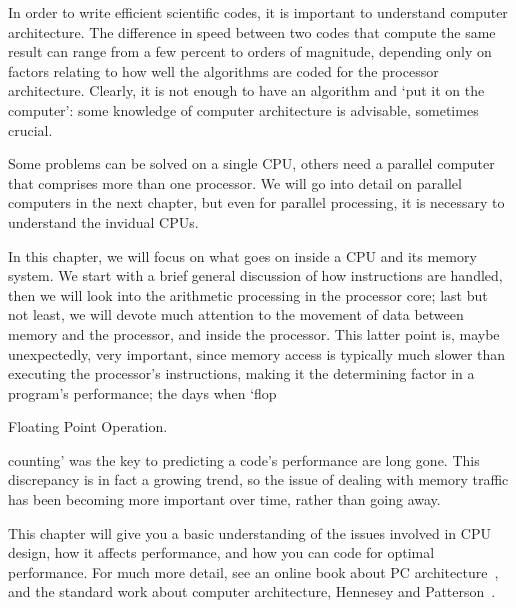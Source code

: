 
In order to write efficient scientific codes, it is important to
understand computer architecture. The difference in speed between two
codes that compute the same result can range from a few percent to
orders of magnitude, depending only on factors relating to how well
the algorithms are coded for the processor architecture. Clearly, it
is not enough to have an algorithm and `put it on the computer': some
knowledge of computer architecture is advisable, sometimes crucial.

Some
problems can be solved on a single \ac{CPU}, others need a parallel
computer that comprises more than one processor. We will go into
detail on parallel computers in the next chapter, but even for
parallel processing, it is necessary to understand the invidual \acp{CPU}.

In this chapter, we will focus on what goes on inside a \ac{CPU} and its
memory system. We start with a brief general discussion of how
instructions are handled, then we will look into the arithmetic
processing in the processor core; last but not least, we will devote
much attention to the movement of data between memory and the
processor, and inside the processor. This latter point is, maybe
unexpectedly, very important, since memory access is typically much
slower than executing the processor's instructions, making it the
determining factor in a program's performance; the days when
`flop
\begin{footnoteenv}
  {Floating Point Operation.}
\end{footnoteenv}
counting' was the key to
predicting a code's performance are long gone. This discrepancy is in
fact a growing trend, so the issue of dealing with memory traffic has
been becoming more important over time, rather than going away.

This chapter will give you a basic understanding of the issues
involved in \ac{CPU} design, how it affects performance, and how you can
code for optimal performance. For much more detail, see 
an online book about PC
architecture~\cite{Karbo:book},
and the standard work about computer architecture, Hennesey and
Patterson~\cite{HennessyPatterson}. 

